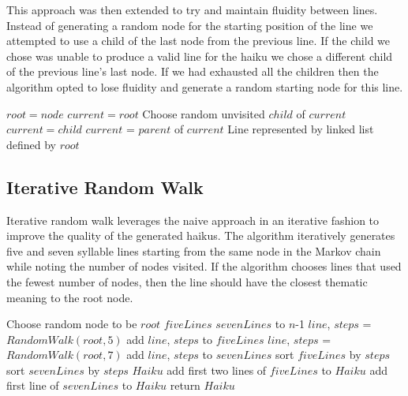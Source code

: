 \documentclass[]{article}
\begin{document}
This approach was then extended to try and maintain fluidity between lines. Instead of generating a random node for the starting position of the line we attempted to use a child of the last node from the previous line. If the child we chose was unable to produce a valid line for the haiku we chose a different child of the previous line's last node. If we had exhausted all the children then the algorithm opted to lose fluidity and generate a random starting node for this line.

\begin{algorithm}[H]
	\caption{$Depth\_First\_Search(node, n)$} \label{DFSB_WithStart}
	\begin{algorithmic}[1]
		\State $root = node$
		\State $current = root$
		\State Choose random unvisited $child$ of $current$
		\State $current = child$
		\EndIf
		\Else
		\Else
		\State $current$ = $parent$ of $current$
		\EndIf
		\EndIf
		\EndWhile
		\Return Line represented by linked list defined by $root$
	\end{algorithmic}
\end{algorithm}



\subsection{Iterative Random Walk}

Iterative random walk leverages the naive approach in an iterative fashion to improve the quality of the generated haikus. The algorithm iteratively generates five and seven syllable lines starting from the same node in the Markov chain while noting the number of nodes visited. If the algorithm chooses lines that used the fewest number of nodes, then the line should have the closest thematic meaning to the root node.

\begin{algorithm}[H]
	\caption{$IterativeRandomWalk(n)$} \label{IterativeRandomWalk}
	\begin{algorithmic}[1]
		\State Choose random node to be $root$
		\State $fiveLines$
		\State $sevenLines$
		 to $n$-1
			\State $line$, $steps$ = $RandomWalk(root, 5)$
			\State add $line$, $steps$ to $fiveLines$
			\State $line$, $steps$ = $RandomWalk(root, 7)$
			\State add $line$, $steps$ to $sevenLines$ 
		\EndFor
		\State sort $fiveLines$ by $steps$
		\State sort $sevenLines$ by $steps$
		\State $Haiku$
		\State add first two lines of $fiveLines$ to $Haiku$
		\State add first line of $sevenLines$ to $Haiku$
		\State return $Haiku$
	\end{algorithmic}
\end{algorithm}
\end{document}
